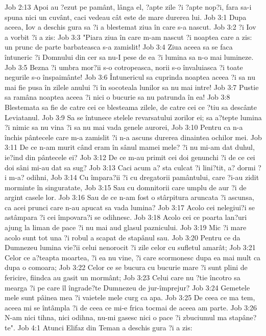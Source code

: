Job 2:13  Apoi au ?ezut pe pamânt, lânga el, ?apte zile ?i ?apte nop?i, fara sa-i spuna nici un cuvânt, caci vedeau cât este de mare durerea lui.
Job 3:1  Dupa aceea, Iov a deschis gura sa ?i a blestemat ziua în care s-a nascut.
Job 3:2  ?i Iov a vorbit ?i a zis:
Job 3:3  "Piara ziua în care m-am nascut ?i noaptea care a zis: un prunc de parte barbateasca s-a zamislit!
Job 3:4  Ziua aceea sa se faca întuneric ?i Domnului din cer sa nu-I pese de ea ?i lumina sa n-o mai lumineze.
Job 3:5  Bezna ?i umbra mor?ii s-o cotropeasca, norii s-o învaluiasca ?i toate negurile s-o înspaimânte!
Job 3:6  Întunericul sa cuprinda noaptea aceea ?i sa nu mai fie pusa în zilele anului ?i în socoteala lunilor sa nu mai intre!
Job 3:7  Pustie sa ramâna noaptea aceea ?i nici o bucurie sa nu patrunda în ea!
Job 3:8  Blestemata sa fie de catre cei ce blesteama zilele, de catre cei ce ?tiu sa descânte Leviatanul.
Job 3:9  Sa se întunece stelele revarsatului zorilor ei; sa a?tepte lumina ?i nimic sa nu vina ?i sa nu mai vada genele aurorei,
Job 3:10  Pentru ca n-a închis pântecele care m-a zamislit ?i n-a ascuns durerea dinaintea ochilor mei.
Job 3:11  De ce n-am murit când eram în sânul mamei mele? ?i nu mi-am dat duhul, ie?ind din pântecele ei?
Job 3:12  De ce m-au primit cei doi genunchi ?i de ce cei doi sâni mi-au dat sa sug?
Job 3:13  Caci acum a? sta culcat ?i lini?tit, a? dormi ?i m-a? odihni,
Job 3:14  Cu împara?ii ?i cu dregatorii pamântului, care ?i-au zidit morminte în singuratate,
Job 3:15  Sau cu domnitorii care umplu de aur ?i de argint casele lor.
Job 3:16  Sau de ce n-am fost o stârpitura aruncata ?i ascunsa, ca acei prunci care n-au apucat sa vada lumina?
Job 3:17  Acolo cei nelegiui?i se astâmpara ?i cei împovara?i se odihnesc.
Job 3:18  Acolo cei ce poarta lan?uri ajung la liman de pace ?i nu mai aud glasul paznicului.
Job 3:19  Mic ?i mare acolo sunt tot una ?i robul a scapat de stapânul sau.
Job 3:20  Pentru ce da Dumnezeu lumina vie?ii celui nenorocit ?i zile celor cu sufletul amarât;
Job 3:21  Celor ce a?teapta moartea, ?i ea nu vine, ?i care scormonesc dupa ea mai mult ca dupa o comoara;
Job 3:22  Celor ce se bucura cu bucurie mare ?i sunt plini de fericire, fiindca au gasit un mormânt;
Job 3:23  Celui care nu ?tie încotro sa mearga ?i pe care îl îngrade?te Dumnezeu de jur-împrejur?
Job 3:24  Gemetele mele sunt pâinea mea ?i vaietele mele curg ca apa.
Job 3:25  De ceea ce ma tem, aceea mi se întâmpla ?i de ceea ce mi-e frica tocmai de aceea am parte.
Job 3:26  N-am nici tihna, nici odihna, nu-mi gasesc nici o pace ?i zbuciumul ma stapâne?te".
Job 4:1  Atunci Elifaz din Teman a deschis gura ?i a zis:
